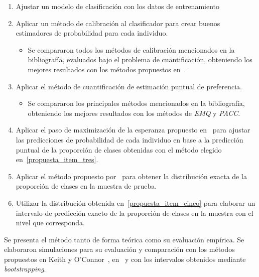 \begin{enumerate}
    \item Ajustar un modelo de clasificación con los datos de entrenamiento
    \item Aplicar un método de calibración al clasificador para crear buenos
    estimadores de probabilidad para cada individuo.
        \begin{itemize}
            \item Se compararon todos los métodos de calibración mencionados en
            la bibliografía, evaluados bajo el problema de cuantificación,
            obteniendo los mejores resultados con los métodos propuestos
            en~\citet{alexandari2020maximum}.
        \end{itemize}
    \item Aplicar el método de cuantificación de estimación puntual de
    preferencia.\label{propuesta_item_tres}
        \begin{itemize}
            \item Se compararon los principales métodos mencionados en la
            bibliografía, obteniendo los mejores resultados con los métodos de
            {\it EMQ\/} y {\it PACC}.
        \end{itemize}
    \item Aplicar el paso de maximización de la esperanza propuesto
    en~\citet{saerens2002adjusting} para ajustar las predicciones de
    probabilidad de cada individuo en base a la predicción puntual de la
    proporción de clases obtenidas con el método elegido
    en~\ref{propuesta_item_tres}.
    \item Aplicar el método propuesto por~\citet{hong2013computing} para obtener
    la distribución exacta de la proporción de clases en la muestra de
    prueba.\label{propuesta_item_cinco}
    \item Utilizar la distribución obtenida en~\ref{propuesta_item_cinco} para
    elaborar un intervalo de predicción exacto de la proporción de clases en la
    muestra con el nivel que corresponda.
\end{enumerate}

Se presenta el método tanto de forma teórica como su evaluación empírica. Se
elaboraron simulaciones para su evaluación y comparación con los métodos
propuestos en Keith y O'Connor~\cite{keith2018uncertainty},
en~\citet{denham2021gain} y con los intervalos obtenidos mediante {\it
bootstrapping}.
